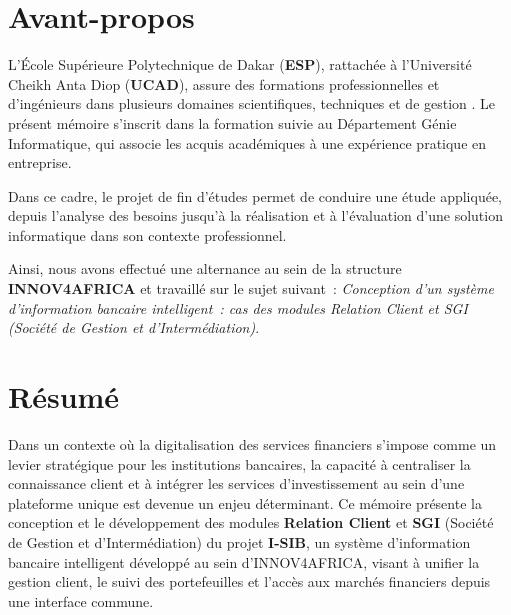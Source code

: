 \documentclass[a4paper,12pt]{report}
\begin{document}
\chapter*{Avant-propos}
{}

L'École Supérieure Polytechnique de Dakar (\textbf{ESP}), rattachée à
l'Université Cheikh Anta Diop (\textbf{UCAD}), assure des formations
professionnelles et d'ingénieurs dans plusieurs domaines scientifiques,
techniques et de gestion \cite{esp_officiel}. Le présent mémoire s'inscrit dans
la formation suivie au Département Génie Informatique, qui associe les acquis
académiques à une expérience pratique en entreprise.

Dans ce cadre, le projet de fin d'études permet de conduire une étude appliquée,
depuis l'analyse des besoins jusqu'à la réalisation et à l'évaluation d'une
solution informatique dans son contexte professionnel.

Ainsi, nous avons effectué une alternance au sein de la structure
\textbf{INNOV4AFRICA} et travaillé sur le sujet suivant~:
\textit{Conception d'un système d'information bancaire intelligent~: cas des
modules Relation Client et SGI (Société de Gestion et d'Intermédiation)}.

\cleardoublepage

\chapter*{Résumé}
{}

\hspace{0.5cm}
Dans un contexte où la digitalisation des services financiers s'impose comme un levier
stratégique pour les institutions bancaires, la capacité à centraliser la connaissance
client et à intégrer les services d'investissement au sein d'une plateforme unique est
devenue un enjeu déterminant. Ce mémoire présente la conception et le développement
des modules \textbf{Relation Client} et \textbf{SGI} (Société de Gestion et
d'Intermédiation) du projet \textbf{I-SIB}, un système d'information bancaire
intelligent développé au sein d'INNOV4AFRICA, visant à unifier la gestion client,
le suivi des portefeuilles et l'accès aux marchés financiers depuis une interface
commune.
\end{document}
